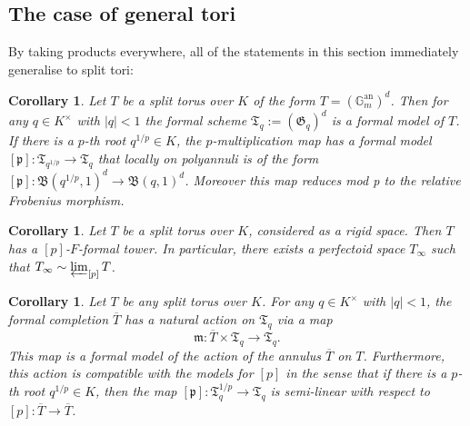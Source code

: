\documentclass[10pt,oneside]{amsart}
\newtheorem{corollary}[theorem]{Corollary}
\theoremstyle{definition}
\begin{document}
	\subsection{The case of general tori}
	By taking products everywhere, all of the statements in this section immediately generalise to split tori:
	\begin{corollary}\label{torus has formal models}
		Let $T$ be a split torus over $K$ of the form $T=(\mathbb G_m^{\operatorname{an}})^d$. Then for any $q\in K^\times$ with $|q|<1$ the formal scheme $\mathfrak T_q := (\mathfrak G_q)^d$ is a formal model of $T$. If there is a $p$-th root $q^{1/p}\in K$, the $p$-multiplication map has a formal model $[\mathfrak p]:\mathfrak T_{q^{1/p}}\rightarrow \mathfrak T_{q}$ that locally on polyannuli is of the form $[\mathfrak p]:\mathfrak B(q^{1/p},1)^d\rightarrow \mathfrak B(q,1)^d$. Moreover this map reduces mod p to the relative Frobenius morphism.
	\end{corollary}
	\begin{corollary}\label{torus has p-F-formal tower and has perfectoid tilde-limit}
		Let $T$ be a split torus over $K$, considered as a rigid space. Then $T$ has a $[p]$-$F$-formal tower. In particular, there exists a perfectoid space $T_\infty$ such that $T_\infty \sim \varprojlim_{[p]} T$. 
	\end{corollary}
	
	\begin{corollary}\label{action on formal model of torus}
		Let $T$ be any split torus over $K$. For any $q\in K^\times$ with $|q|<1$, the formal completion $\overline{T}$ has a natural action on $\mathfrak T_q$ via a map
		\[\mathfrak m:\overline{T}\times \mathfrak T_q\rightarrow \mathfrak T_q.\]
		This map is a formal model of the action of the annulus $\overline{T}$ on $T$. Furthermore, this action is compatible with the models for $[p]$ in the sense that if there is a $p$-th root $q^{1/p}\in K$, then the map $[\mathfrak p]:\mathfrak T_q^{1/p}\rightarrow \mathfrak T_q$ is semi-linear with respect to $[p]:\overline{T}\rightarrow \overline{T}$.
	\end{corollary} 
	
\end{document}
